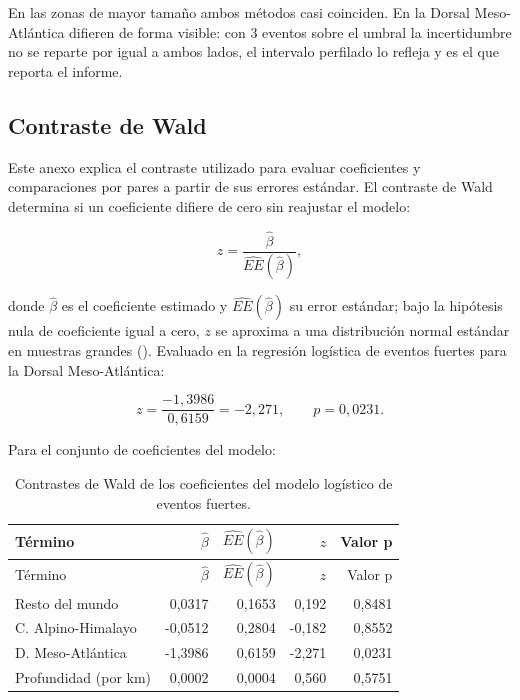 \documentclass[
  spanish,
  letterpaper,
  DIV=11,
  numbers=noendperiod]{scrartcl}
\begin{document}
En las zonas de mayor tamaño ambos métodos casi coinciden. En la Dorsal
Meso-Atlántica difieren de forma visible: con 3 eventos sobre el umbral
la incertidumbre no se reparte por igual a ambos lados, el intervalo
perfilado lo refleja y es el que reporta el informe.

\subsection{Contraste de Wald}\label{sec-anexo-wald}

Este anexo explica el contraste utilizado para evaluar coeficientes y
comparaciones por pares a partir de sus errores estándar. El contraste
de Wald determina si un coeficiente difiere de cero sin reajustar el
modelo:

\[
z=\frac{\hat\beta}{\widehat{EE}(\hat\beta)},
\]

donde \(\hat\beta\) es el coeficiente estimado y
\(\widehat{EE}(\hat\beta)\) su error estándar; bajo la hipótesis nula de
coeficiente igual a cero, \(z\) se aproxima a una distribución normal
estándar en muestras grandes ().
Evaluado en la regresión logística de eventos fuertes para la Dorsal
Meso-Atlántica:

\[
z=\frac{-1{,}3986}{0{,}6159}=-2{,}271,
\qquad
p=0{,}0231.
\]

Para el conjunto de coeficientes del modelo:

\begin{longtable}[]{@{}lrrrr@{}}
\caption{Contrastes de Wald de los coeficientes del modelo logístico de
eventos fuertes.}\label{tbl-wald-coeficientes}\tabularnewline
\toprule\noalign{}
Término & \(\hat\beta\) & \(\widehat{EE}(\hat\beta)\) & \(z\) & Valor
p \\
\midrule\noalign{}
\endfirsthead
\toprule\noalign{}
Término & \(\hat\beta\) & \(\widehat{EE}(\hat\beta)\) & \(z\) & Valor
p \\
\midrule\noalign{}
\endhead
\bottomrule\noalign{}
\endlastfoot
Resto del mundo & 0,0317 & 0,1653 & 0,192 & 0,8481 \\
C. Alpino-Himalayo & -0,0512 & 0,2804 & -0,182 & 0,8552 \\
D. Meso-Atlántica & -1,3986 & 0,6159 & -2,271 & 0,0231 \\
Profundidad (por km) & 0,0002 & 0,0004 & 0,560 & 0,5751 \\
\end{longtable}
\end{document}
